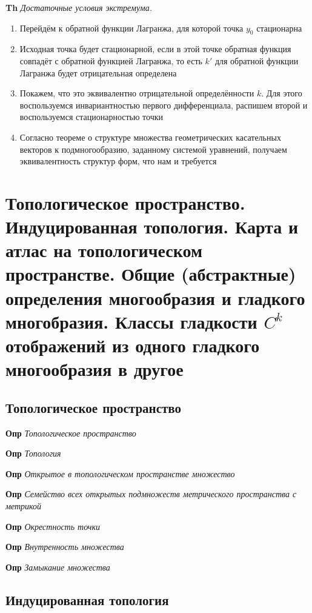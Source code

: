 \documentclass[a4paper, 14pt]{article}
\begin{document}
    \textbf{Th} \textit{Достаточные условия экстремума.}
    
    \begin{enumerate}
        \item Перейдём к обратной функции Лагранжа, для которой точка $y_0$ стационарна
        \item Исходная точка будет стационарной, если в этой точке обратная функция совпадёт с обратной функцией
        Лагранжа, то есть $k'$ для обратной функции Лагранжа будет отрицательная определена
        \item Покажем, что это эквивалентно отрицательной определённости $k$.
        Для этого воспользуемся инвариантностью первого дифференциала, распишем второй и воспользуемся
        стационарностью точки
        \item Согласно теореме о структуре множества геометрических касательных векторов к подмногообразию, заданному
        системой уравнений, получаем эквивалентность структур форм, что нам и требуется
    \end{enumerate}
    
    \section{Топологическое пространство.
    Индуцированная топология.
    Карта и атлас на топологическом пространстве.
    Общие (абстрактные) определения многообразия и гладкого многобразия.
    Классы гладкости $C^k$ отображений из одного гладкого многообразия в другое}
    
    \subsection{Топологическое пространство}
    
    \textbf{Опр} \textit{Топологическое пространство}
    
    \textbf{Опр} \textit{Топология}
    
    \textbf{Опр} \textit{Открытое в топологическом пространстве множество}
    
    \textbf{Опр} \textit{Семейство всех открытых подмножеств метрического пространства с метрикой}
    
    \textbf{Опр} \textit{Окрестность точки}
    
    \textbf{Опр} \textit{Внутренность множества}
    
    \textbf{Опр} \textit{Замыкание множества}
    
    \subsection{Индуцированная топология}
    
\end{document}

